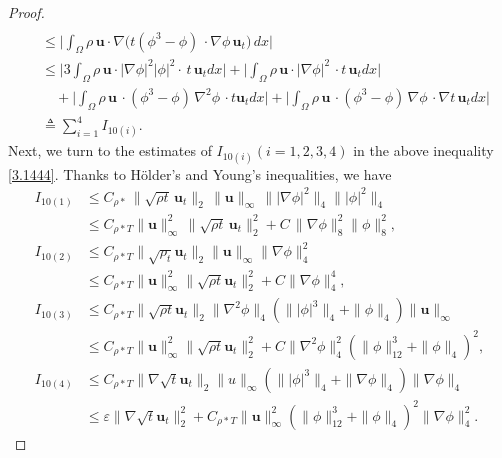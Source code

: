 \documentclass[11pt]{article}
\numberwithin{equation}{section}
\begin{document}
\begin{proof}
\begin{equation}
\begin{split}
\\&\leq\big| \int_{\Omega} \rho \, \mathbf{u} \cdot \nabla \bigl(t(\phi^3 - \phi) \, \cdot \nabla \phi \, \mathbf{u}_t \bigr) \, dx \big|\\
&\leq \big| 3\int_{\Omega} \rho \, \mathbf{u}\cdot \big| \nabla \phi \big|^2|\phi|^2\cdot \, t \, \mathbf{u}_t dx \big| + \big| \int_{\Omega} \rho \, \mathbf{u} \cdot\big| \nabla \phi \big|^2 \,\cdot t \, \mathbf{u}_t dx \big| \\
&\quad + \big| \int_{\Omega} \rho \, \mathbf{u} \,\cdot (\phi^3 - \phi) \, \nabla^2 \phi \, \cdot t \mathbf{u}_t dx \big| + \big| \int_{\Omega} \rho \, \mathbf{u} \, \cdot (\phi^3 - \phi) \, \nabla \phi \, \cdot\nabla t\, \mathbf{u}_t dx \big|
\\&\triangleq \sum_{i = 1}^{4} I_{10(i)}.
\end{split}
\end{equation}
Next, we turn to the estimates of $I_{10(i)}(i=1,2,3,4)$ in the above inequality \eqref{3.1444}. Thanks to H\"{o}lder's and Young's inequalities, we have
\begin{equation*}
\begin{split}
I_{10(1)} &\leq C_{\rho*} \, \|\sqrt{\rho t} \, \mathbf{u}_t\|_2 \, \|\mathbf{u}\|_{\infty} \, \| \left| \nabla \phi \right|^2 \|_4\| \left|\phi \right|^2 \|_4\\& \leq C_{\rho*T} \|\mathbf{u}\|_{\infty}^2 \, \|\sqrt{\rho t} \, \mathbf{u}_t\|_2^2 + C \, \|\nabla \phi\|_8^2\|\phi\|_8^2,\\
I_{10(2)} &\leq C_{\rho*T} \|\sqrt{\rho_t} \mathbf{u}_t\|_{2} \|\mathbf{u}\|_{\infty} \| \nabla\phi \|_{4}^2\\& \leq C_{\rho*T} \|\mathbf{u}\|_{\infty}^2 \|\sqrt{\rho t} \mathbf{u}_t\|_{2}^2 + C \|\nabla \phi \|_{4}^4 ,\\
I_{10(3)} &\leq C_{\rho*T} \|\sqrt{\rho t} \mathbf{u}_t\|_{2} \|\nabla^2 \phi\|_{4} \left( \||\phi|^3\|_{4} + \|\phi\|_{4} \right) \|\mathbf{u}\|_{\infty}\\& \leq C_{\rho*T}\|\mathbf{u}\|_{\infty}^2 \|\sqrt{\rho t} \mathbf{u}_t\|_{2}^2 + C \|\nabla^2 \phi\|_{4}^2 \left( \|\phi\|_{12}^3 + \|\phi\|_{4} \right)^2,\\
I_{10(4)} &\leq C_{\rho*T} \|\nabla\sqrt{t} \mathbf{u}_t\|_{2} \|u\|_{\infty} \left( \||\phi|^3\|_{4} + \|\nabla\phi\|_{4} \right) \|\nabla\phi\|_{4} \\ &\leq \varepsilon\|\nabla\sqrt{t} \mathbf{u}_t\|_{2}^2 + C_{\rho*T} \|\mathbf{u}\|_{\infty}^2 \left( \|\phi\|_{12}^3 + \|\phi\|_{4} \right)^2 \|\nabla\phi\|_{4}^2 .

\end{split}
\end{equation*}
\end{proof}
\end{document}
